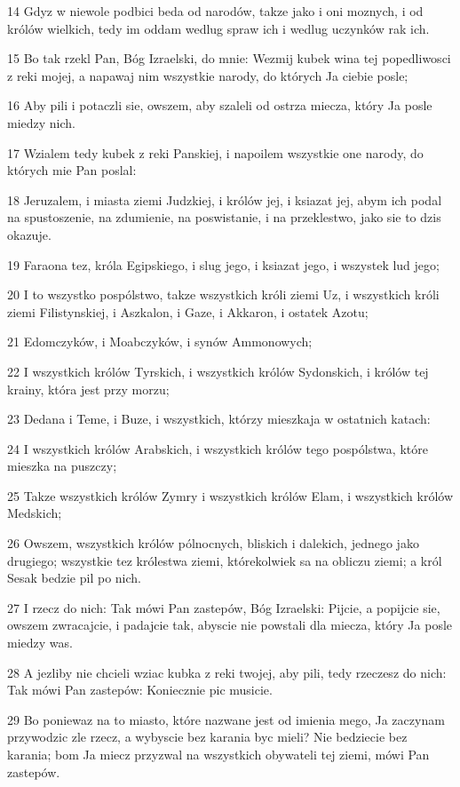 \par 14 Gdyz w niewole podbici beda od narodów, takze jako i oni moznych, i od królów wielkich, tedy im oddam wedlug spraw ich i wedlug uczynków rak ich.
\par 15 Bo tak rzekl Pan, Bóg Izraelski, do mnie: Wezmij kubek wina tej popedliwosci z reki mojej, a napawaj nim wszystkie narody, do których Ja ciebie posle;
\par 16 Aby pili i potaczli sie, owszem, aby szaleli od ostrza miecza, który Ja posle miedzy nich.
\par 17 Wzialem tedy kubek z reki Panskiej, i napoilem wszystkie one narody, do których mie Pan poslal:
\par 18 Jeruzalem, i miasta ziemi Judzkiej, i królów jej, i ksiazat jej, abym ich podal na spustoszenie, na zdumienie, na poswistanie, i na przeklestwo, jako sie to dzis okazuje.
\par 19 Faraona tez, króla Egipskiego, i slug jego, i ksiazat jego, i wszystek lud jego;
\par 20 I to wszystko pospólstwo, takze wszystkich króli ziemi Uz, i wszystkich króli ziemi Filistynskiej, i Aszkalon, i Gaze, i Akkaron, i ostatek Azotu;
\par 21 Edomczyków, i Moabczyków, i synów Ammonowych;
\par 22 I wszystkich królów Tyrskich, i wszystkich królów Sydonskich, i królów tej krainy, która jest przy morzu;
\par 23 Dedana i Teme, i Buze, i wszystkich, którzy mieszkaja w ostatnich katach:
\par 24 I wszystkich królów Arabskich, i wszystkich królów tego pospólstwa, które mieszka na puszczy;
\par 25 Takze wszystkich królów Zymry i wszystkich królów Elam, i wszystkich królów Medskich;
\par 26 Owszem, wszystkich królów pólnocnych, bliskich i dalekich, jednego jako drugiego; wszystkie tez królestwa ziemi, którekolwiek sa na obliczu ziemi; a król Sesak bedzie pil po nich.
\par 27 I rzecz do nich: Tak mówi Pan zastepów, Bóg Izraelski: Pijcie, a popijcie sie, owszem zwracajcie, i padajcie tak, abyscie nie powstali dla miecza, który Ja posle miedzy was.
\par 28 A jezliby nie chcieli wziac kubka z reki twojej, aby pili, tedy rzeczesz do nich: Tak mówi Pan zastepów: Koniecznie pic musicie.
\par 29 Bo poniewaz na to miasto, które nazwane jest od imienia mego, Ja zaczynam przywodzic zle rzecz, a wybyscie bez karania byc mieli? Nie bedziecie bez karania; bom Ja miecz przyzwal na wszystkich obywateli tej ziemi, mówi Pan zastepów.
